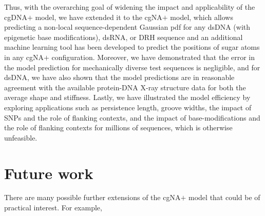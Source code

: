 Thus, with the overarching goal of widening the impact and applicability of the cgDNA$+$ model, we have extended it to the cgNA$+$ model, which allows predicting a non-local sequence-dependent Gaussian pdf for any dsDNA (with epigenetic base modifications), dsRNA, or DRH sequence and an additional machine learning tool has been developed to predict the positions of sugar atoms in any cgNA$+$ configuration. 
Moreover, we have demonstrated that the error in the model prediction for mechanically diverse test sequences is negligible, and for dsDNA, we have also shown that the model predictions are in reasonable agreement with the available protein-DNA X-ray structure data for both the average shape and stiffness.
Lastly, we have illustrated the model efficiency by exploring applications such as persistence length, groove widths, the impact of SNPs and the role of flanking contexts, and the impact of base-modifications and the role of flanking contexts for millions of sequences, which is otherwise unfeasible.

\clearpage

\section{Future work} 
There are many possible further extensions of the cgNA$+$ model that could be of practical interest. For example, 

